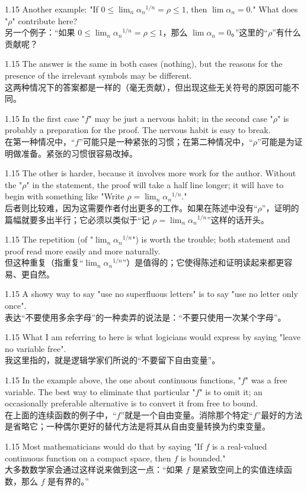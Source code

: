 \documentclass[12pt,a4paper]{article}
\newcommand{\bilingual}[2]{
    \begin{spacing}{1.15} %
        \noindent \normalsize #1 \\[-0.5ex] %
        \small \textcolor{blue!70!black}{#2} %
    \end{spacing}
    \vspace{0.8em} %
}
\begin{document}
\bilingual{Another example: "If $0 \le \lim_{n}{\alpha_{n}}^{1/n} = \rho \le 1$, then $\lim \alpha_{n}=0$." What does "$\rho$" contribute here?}
{另一个例子：“如果 $0 \le \lim_{n}{\alpha_{n}}^{1/n} = \rho \le 1$，那么 $\lim \alpha_{n}=0$。”这里的“$\rho$”有什么贡献呢？} %

\bilingual{The answer is the same in both cases (nothing), but the reasons for the presence of the irrelevant symbols may be different.}
{这两种情况下的答案都是一样的（毫无贡献），但出现这些无关符号的原因可能不同。} %

\bilingual{In the first case "$f$" may be just a nervous habit; in the second case "$\rho$" is probably a preparation for the proof. The nervous habit is easy to break.}
{在第一种情况中，“$f$”可能只是一种紧张的习惯；在第二种情况中，“$\rho$”可能是为证明做准备。紧张的习惯很容易改掉。} %

\bilingual{The other is harder, because it involves more work for the author. Without the "$\rho$" in the statement, the proof will take a half line longer; it will have to begin with something like "Write $\rho = \lim_{n}{\alpha_{n}}^{1/n}$."}
{后者则比较难，因为这需要作者付出更多的工作。如果在陈述中没有“$\rho$”，证明的篇幅就要多出半行；它必须以类似于“记 $\rho = \lim_{n}{\alpha_{n}}^{1/n}$”这样的话开头。} %

\bilingual{The repetition (of "$\lim_{n}{\alpha_{n}}^{1/n}$") is worth the trouble; both statement and proof read more easily and more naturally.}
{但这种重复（指重复“$\lim_{n}{\alpha_{n}}^{1/n}$”）是值得的；它使得陈述和证明读起来都更容易、更自然。} %

\bilingual{A showy way to say "use no superfluous letters" is to say "use no letter only once".}
{表达“不要使用多余字母”的一种卖弄的说法是：“不要只使用一次某个字母”。} %

\bilingual{What I am referring to here is what logicians would express by saying "leave no variable free".}
{我这里指的，就是逻辑学家们所说的“不要留下自由变量”。} %

\bilingual{In the example above, the one about continuous functions, "$f$" was a free variable. The best way to eliminate that particular "$f$" is to omit it; an occasionally preferable alternative is to convert it from free to bound.}
{在上面的连续函数的例子中，“$f$”就是一个自由变量。消除那个特定“$f$”最好的方法是省略它；一种偶尔更好的替代方法是将其从自由变量转换为约束变量。} %

\bilingual{Most mathematicians would do that by saying "If $f$ is a real-valued continuous function on a compact space, then $f$ is bounded."}
{大多数数学家会通过这样说来做到这一点：“如果 $f$ 是紧致空间上的实值连续函数，那么 $f$ 是有界的。”} %
\end{document}

